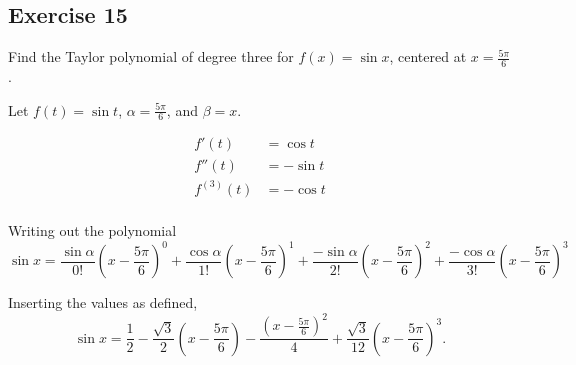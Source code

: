 \documentclass{tufte-book}
\theoremstyle{mytheoremstyle}
\theoremstyle{mylemstyle}
\theoremstyle{mydefstyle}
\begin{document}
\subsection{Exercise 15}
Find the Taylor polynomial of degree three for $f(x) = \sin x$, centered at $x=\frac{5\pi}{6}$.

Let $f(t) = \sin t$, $\alpha = \frac{5\pi}{6}$, and $\beta=x$.

\begin{align*}
f'(t) &= \cos t\\
f''(t) &= -\sin t\\
f^{(3)}(t) &= -\cos t\\
\end{align*}

Writing out the polynomial
\begin{equation*}
\sin x = \frac{\sin \alpha}{0!}(x-\frac{5\pi}{6})^0 + \frac{\cos \alpha}{1!}(x-\frac{5\pi}{6})^1 + \frac{-\sin \alpha}{2!}(x-\frac{5\pi}{6})^2 + \frac{-\cos \alpha}{3!}(x-\frac{5\pi}{6})^3
\end{equation*}

Inserting the values as defined,
\begin{equation*}
\sin x = \frac{1}{2} - \frac{\sqrt{3}}{2}(x-\frac{5\pi}{6}) - \frac{(x-\frac{5\pi}{6})^2}{4} + \frac{\sqrt{3}}{12}(x-\frac{5\pi}{6})^3.
\end{equation*}
\end{document}
